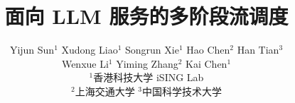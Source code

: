 \documentclass[sigconf]{acmart}
\begin{document}
\pagestyle{plain}

\title{面向 LLM 服务的多阶段流调度}

\author{
  Yijun Sun$^{1}$ \quad
  Xudong Liao$^{1}$ \quad
  Songrun Xie$^{1}$ \quad
  Hao Chen$^{2}$ \quad
  Han Tian$^{3}$ \\
  Wenxue Li$^{1}$ \quad
  Yiming Zhang$^{2}$ \quad
  Kai Chen$^{1}$ \\
  \vspace{0.2cm}
  $^{1}$香港科技大学 iSING Lab \\
  $^{2}$上海交通大学 \quad
  $^{3}$中国科学技术大学 \\
  \vspace{0.1cm}
}

\renewcommand{\shortauthors}{Sun et al.}
\renewcommand{\abstractname}{摘要}

\begin{abstract}

\end{abstract}

\maketitle









\normalem





\end{document}
